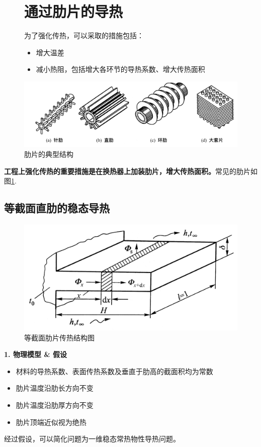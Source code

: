 \begin{figure}[!htb]
	\section{通过肋片的导热}
	为了强化传热，可以采取的措施包括：\vspace*{-0.5em}
	\begin{itemize}
		\item 增大温差
\vspace*{-1em}
		\item 减小热阻，包括增大各环节的导热系数、增大传热面积
\vspace*{-0.5em}
	\end{itemize}
{
	\centering
	\includegraphics[width=0.75\linewidth]{pic/肋片.jpg}
	\vspace*{-1.5em}
	\caption{肋片的典型结构}
	\label{肋片的典型结构}
}
\vspace*{-2em}
\end{figure}

\newpage
\textbf{工程上强化传热的重要措施是在换热器上加装肋片，增大传热面积。}常见的肋片如图\ref{肋片的典型结构}.
\vspace*{0.5em}

\subsection{等截面直肋的稳态导热
}
\begin{figure}[!htb]
	\vspace*{-1em}
	\centering
	\includegraphics[width=0.5\linewidth]{pic/等截面肋片1.jpeg}
	\vspace*{-1.5em}
	\caption{等截面肋片传热结构图}
	\label{等截面肋片传热结构图}
\end{figure}

\noindent \textbf{1. 物理模型 \& 假设}
\begin{itemize}
	\item 材料的导热系数、表面传热系数及垂直于肋高的截面积均为常数
\vspace*{-0.5em}
	\item 肋片温度沿肋长方向不变
\vspace*{-0.5em}
	\item 肋片温度沿肋厚方向不变
\vspace*{-0.5em}
	\item 肋片顶端近似视为绝热
\end{itemize}
经过假设，可以简化问题为一维稳态常热物性导热问题。

